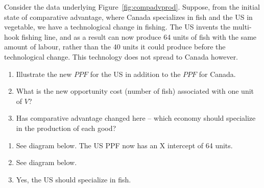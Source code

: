 \begin{enumialphparenastyle}
\begin{econex}\label{ex:ch15ex6}
Consider the data underlying Figure~\ref{fig:compadvprod}. Suppose, from the initial state of comparative advantage, where Canada specializes in fish and the US in vegetable, we have a technological change in fishing. The US invents the multi-hook fishing line, and as a result can now produce 64 units of fish with the same amount of labour, rather than the 40 units it could produce before the technological change. This technology does not spread to Canada however.
\begin{enumerate}
\item	Illustrate the new $PPF$ for the US in addition to the $PPF$ for Canada. 
\item	What is the new opportunity cost (number of fish) associated with one unit of $V$?
\item	Has comparative advantage changed here -- which economy should specialize in the production of each good?
\end{enumerate}
\begin{econsolution}
\begin{enumerate}
\item	See diagram below. The US PPF now has an X intercept of 64 units.
\item	See diagram below.
\item	Yes, the US should specialize in fish.
\end{enumerate}



\end{econsolution}
\end{econex}
\end{enumialphparenastyle}
